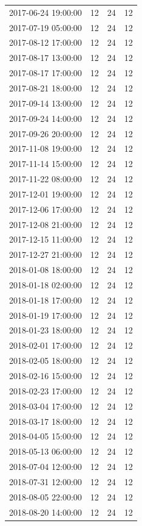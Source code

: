 \begin{tabular}{lrrr}
2017-06-24 19:00:00 & 12 & 24 & 12 \\
2017-07-19 05:00:00 & 12 & 24 & 12 \\
2017-08-12 17:00:00 & 12 & 24 & 12 \\
2017-08-17 13:00:00 & 12 & 24 & 12 \\
2017-08-17 17:00:00 & 12 & 24 & 12 \\
2017-08-21 18:00:00 & 12 & 24 & 12 \\
2017-09-14 13:00:00 & 12 & 24 & 12 \\
2017-09-24 14:00:00 & 12 & 24 & 12 \\
2017-09-26 20:00:00 & 12 & 24 & 12 \\
2017-11-08 19:00:00 & 12 & 24 & 12 \\
2017-11-14 15:00:00 & 12 & 24 & 12 \\
2017-11-22 08:00:00 & 12 & 24 & 12 \\
2017-12-01 19:00:00 & 12 & 24 & 12 \\
2017-12-06 17:00:00 & 12 & 24 & 12 \\
2017-12-08 21:00:00 & 12 & 24 & 12 \\
2017-12-15 11:00:00 & 12 & 24 & 12 \\
2017-12-27 21:00:00 & 12 & 24 & 12 \\
2018-01-08 18:00:00 & 12 & 24 & 12 \\
2018-01-18 02:00:00 & 12 & 24 & 12 \\
2018-01-18 17:00:00 & 12 & 24 & 12 \\
2018-01-19 17:00:00 & 12 & 24 & 12 \\
2018-01-23 18:00:00 & 12 & 24 & 12 \\
2018-02-01 17:00:00 & 12 & 24 & 12 \\
2018-02-05 18:00:00 & 12 & 24 & 12 \\
2018-02-16 15:00:00 & 12 & 24 & 12 \\
2018-02-23 17:00:00 & 12 & 24 & 12 \\
2018-03-04 17:00:00 & 12 & 24 & 12 \\
2018-03-17 18:00:00 & 12 & 24 & 12 \\
2018-04-05 15:00:00 & 12 & 24 & 12 \\
2018-05-13 06:00:00 & 12 & 24 & 12 \\
2018-07-04 12:00:00 & 12 & 24 & 12 \\
2018-07-31 12:00:00 & 12 & 24 & 12 \\
2018-08-05 22:00:00 & 12 & 24 & 12 \\
2018-08-20 14:00:00 & 12 & 24 & 12 \\

\end{tabular}
